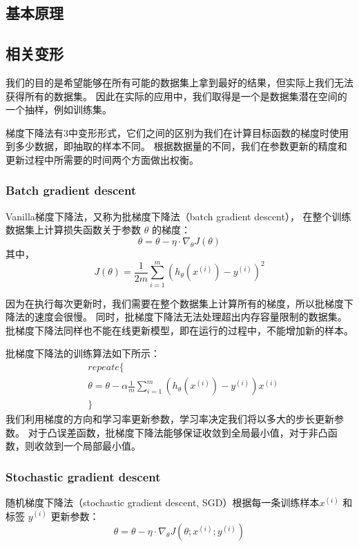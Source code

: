\documentclass[a4paper,10pt]{ctexbook}
\begin{document}
\subsection{基本原理}

\subsection{相关变形}
我们的目的是希望能够在所有可能的数据集上拿到最好的结果，但实际上我们无法获得所有的数据集。
因此在实际的应用中，我们取得是一个是数据集潜在空间的一个抽样，例如训练集。

梯度下降法有3中变形形式，它们之间的区别为我们在计算目标函数的梯度时使用到多少数据，即抽取的样本不同。
根据数据量的不同，我们在参数更新的精度和更新过程中所需要的时间两个方面做出权衡。


\subsubsection{Batch gradient descent}
Vanilla梯度下降法，又称为批梯度下降法（batch gradient descent），
在整个训练数据集上计算损失函数关于参数 $\theta$ 的梯度：
\[
    \theta = \theta - \eta \cdot \nabla_{\theta}{J(\theta)}
\]
其中，
\[
    J(\theta)=\frac{1}{2m}{\sum_{i=1}^{m}{(h_{\theta}(x^{(i)}) - y^{(i)})^2}}
\]

因为在执行每次更新时，我们需要在整个数据集上计算所有的梯度，所以批梯度下降法的速度会很慢。
同时，批梯度下降法无法处理超出内存容量限制的数据集。
批梯度下降法同样也不能在线更新模型，即在运行的过程中，不能增加新的样本。

批梯度下降法的训练算法如下所示：
\begin{align*}
    & repeate \{ \\
    &    \theta = \theta - \alpha \frac{1}{m}{\sum_{i=1}^{m}{(h_{\theta}(x^{(i)}) - y^{(i)})x^{(i)}}} \\
    & \}
\end{align*}
我们利用梯度的方向和学习率更新参数，学习率决定我们将以多大的步长更新参数。
对于凸误差函数，批梯度下降法能够保证收敛到全局最小值，对于非凸函数，则收敛到一个局部最小值。


\subsubsection{Stochastic gradient descent}
随机梯度下降法（stochastic gradient descent, SGD）根据每一条训练样本$ x^{(i)}$ 和标签 $y^{(i)}$ 更新参数：
\[
    \theta = \theta - \eta \cdot \nabla_{\theta}{J(\theta;x^{(i)};y^{(i)})}
\]
\end{document}
